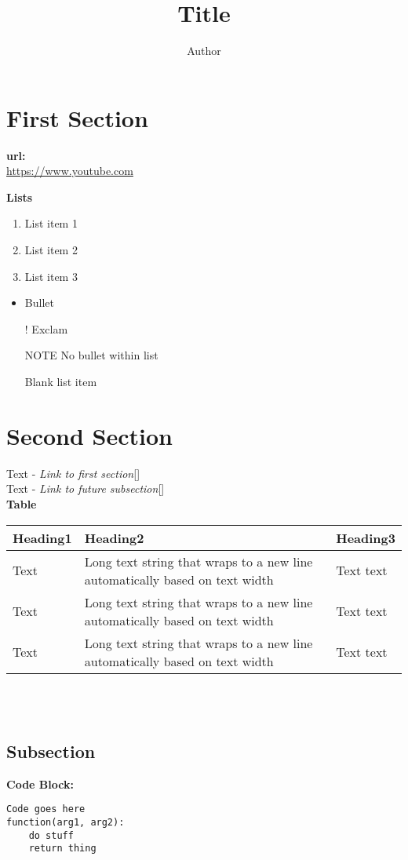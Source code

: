 \documentclass{article}
\title{Title}
\author{Author}
\begin{document}
\maketitle
\tableofcontents


\section*{First Section}
\label{s:first}

\textbf{url:}\\
\url{https://www.youtube.com}

\textbf{Lists}\\
\begin{enumerate}
    \item List item 1
    \item List item 2
    \item List item 3
\end{enumerate}

\begin{itemize}
    \item Bullet
    \item[!] Exclam
    \item[NOTE] No bullet within list
    \item[] Blank list item
\end{itemize}

\section*{Second Section}
\label{s:second}

Text - \textit{Link to first section}[]\\
Text - \textit{Link to future subsection}[]
\\

\textbf{Table}\\
\begin{tabularx}{\textwidth}{ | >{\hsize}Y | Y | >{\hsize}Y | }
    \hline
    Heading1 & Heading2 & Heading3 \\
    \hline
    Text & Long text string that wraps to a new line automatically based on text width & Text text \\
    \hline
    Text & Long text string that wraps to a new line automatically based on text width & Text text \\
    \hline
    Text & Long text string that wraps to a new line automatically based on text width & Text text \\
    \hline
\end{tabularx}\\
\\


\subsection*{Subsection}
\label{ss:subsection}

\textbf{Code Block:}
\begin{verbatim}
Code goes here
function(arg1, arg2):
    do stuff
    return thing
\end{verbatim}
\end{document}

